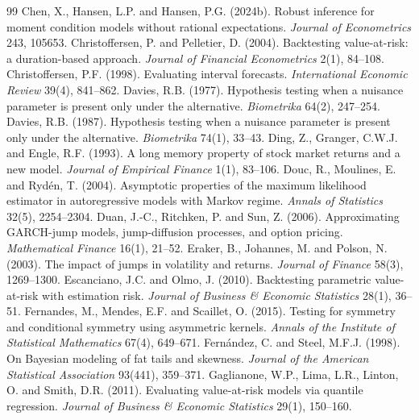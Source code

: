 \documentclass[11pt,a4paper]{article}
\theoremstyle{definition}
\theoremstyle{remark}
\begin{document}
\begin{thebibliography}{99}
 Chen, X., Hansen, L.P. and Hansen, P.G. (2024b). Robust inference for moment condition models without rational expectations. \emph{Journal of Econometrics} 243, 105653.
 Christoffersen, P. and Pelletier, D. (2004). Backtesting value-at-risk: a duration-based approach. \emph{Journal of Financial Econometrics} 2(1), 84--108.
 Christoffersen, P.F. (1998). Evaluating interval forecasts. \emph{International Economic Review} 39(4), 841--862.
 Davies, R.B. (1977). Hypothesis testing when a nuisance parameter is present only under the alternative. \emph{Biometrika} 64(2), 247--254.
 Davies, R.B. (1987). Hypothesis testing when a nuisance parameter is present only under the alternative. \emph{Biometrika} 74(1), 33--43.
 Ding, Z., Granger, C.W.J. and Engle, R.F. (1993). A long memory property of stock market returns and a new model. \emph{Journal of Empirical Finance} 1(1), 83--106.
 Douc, R., Moulines, E. and Ryd\'en, T. (2004). Asymptotic properties of the maximum likelihood estimator in autoregressive models with Markov regime. \emph{Annals of Statistics} 32(5), 2254--2304.
 Duan, J.-C., Ritchken, P. and Sun, Z. (2006). Approximating GARCH-jump models, jump-diffusion processes, and option pricing. \emph{Mathematical Finance} 16(1), 21--52.
 Eraker, B., Johannes, M. and Polson, N. (2003). The impact of jumps in volatility and returns. \emph{Journal of Finance} 58(3), 1269--1300.
 Escanciano, J.C. and Olmo, J. (2010). Backtesting parametric value-at-risk with estimation risk. \emph{Journal of Business \& Economic Statistics} 28(1), 36--51.
 Fernandes, M., Mendes, E.F. and Scaillet, O. (2015). Testing for symmetry and conditional symmetry using asymmetric kernels. \emph{Annals of the Institute of Statistical Mathematics} 67(4), 649--671.
 Fern\'andez, C. and Steel, M.F.J. (1998). On Bayesian modeling of fat tails and skewness. \emph{Journal of the American Statistical Association} 93(441), 359--371.
 Gaglianone, W.P., Lima, L.R., Linton, O. and Smith, D.R. (2011). Evaluating value-at-risk models via quantile regression. \emph{Journal of Business \& Economic Statistics} 29(1), 150--160.

\end{thebibliography}
\end{document}
